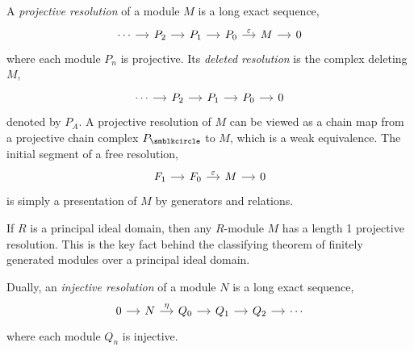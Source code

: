 A \emph{projective resolution} of a module $M$ is a long exact sequence,
\begin{equation*}
  \begin{tikzcd}[sep=small]
    \dotsb & P_2 & P_1 & P_0 & M & 0
    \arrow[from=1-1,]{1-2}[]{}
    \arrow[from=1-2,]{1-3}[]{}
    \arrow[from=1-3,]{1-4}[]{}
    \arrow[from=1-4,]{1-5}[]{\varepsilon}
    \arrow[from=1-5,]{1-6}[]{}
  \end{tikzcd}
\end{equation*}
where each module $P_n$ is projective. Its \emph{deleted resolution} is the complex deleting $M$,
\begin{equation*}
  \begin{tikzcd}[sep=small]
    \dotsb & P_2 & P_1 & P_0 & 0
    \arrow[from=1-1,]{1-2}[]{}
    \arrow[from=1-2,]{1-3}[]{}
    \arrow[from=1-3,]{1-4}[]{}
    \arrow[from=1-4,]{1-5}[]{}
  \end{tikzcd}
\end{equation*}
denoted by $P_A$. A projective resolution of $M$ can be viewed as a chain map from a projective chain complex $P_\CCCIR$ to $M$, which is a weak equivalence. The initial segment of a free resolution,
\begin{equation*}
  \begin{tikzcd}[sep=small]
    F_1 & F_0 & M & 0
    \arrow[from=1-1,]{1-2}[]{}
    \arrow[from=1-2,]{1-3}[]{\varepsilon}
    \arrow[from=1-3,]{1-4}[]{}
  \end{tikzcd}
\end{equation*}
is simply a presentation of $M$ by generators and relations.

\begin{example}
  If $R$ is a principal ideal domain, then any $R$-module $M$ has a length 1 projective resolution. This is the key fact behind the classifying theorem of finitely generated modules over a principal ideal domain.
\end{example}

Dually, an \emph{injective resolution} of a module $N$ is a long exact sequence,
\begin{equation*}
  \begin{tikzcd}[sep=small]
    0 & N & Q_0 & Q_1 & Q_2 & \dotsb
    \arrow[from=1-1,]{1-2}[]{}
    \arrow[from=1-2,]{1-3}[]{\eta}
    \arrow[from=1-3,]{1-4}[]{}
    \arrow[from=1-4,]{1-5}[]{}
    \arrow[from=1-5,]{1-6}[]{}
  \end{tikzcd}
\end{equation*}
where each module $Q_n$ is injective.

